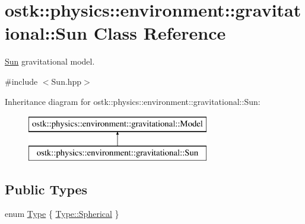 \hypertarget{classostk_1_1physics_1_1environment_1_1gravitational_1_1_sun}{}\section{ostk\+:\+:physics\+:\+:environment\+:\+:gravitational\+:\+:Sun Class Reference}
\label{classostk_1_1physics_1_1environment_1_1gravitational_1_1_sun}


\hyperlink{classostk_1_1physics_1_1environment_1_1gravitational_1_1_sun}{Sun} gravitational model.  




{\ttfamily \#include $<$Sun.\+hpp$>$}

Inheritance diagram for ostk\+:\+:physics\+:\+:environment\+:\+:gravitational\+:\+:Sun\+:\begin{figure}[H]
\begin{center}
\leavevmode
\includegraphics[height=2.000000cm]{classostk_1_1physics_1_1environment_1_1gravitational_1_1_sun}
\end{center}
\end{figure}
\subsection*{Public Types}
\begin{DoxyCompactItemize}
\item 
enum \hyperlink{classostk_1_1physics_1_1environment_1_1gravitational_1_1_sun_ae567145f71c7750a9e4e43a309bd19db}{Type} \{ \hyperlink{classostk_1_1physics_1_1environment_1_1gravitational_1_1_sun_ae567145f71c7750a9e4e43a309bd19dba24e5c24fabd1c081d4c729094df0b947}{Type\+::\+Spherical}
 \}
\end{DoxyCompactItemize}
